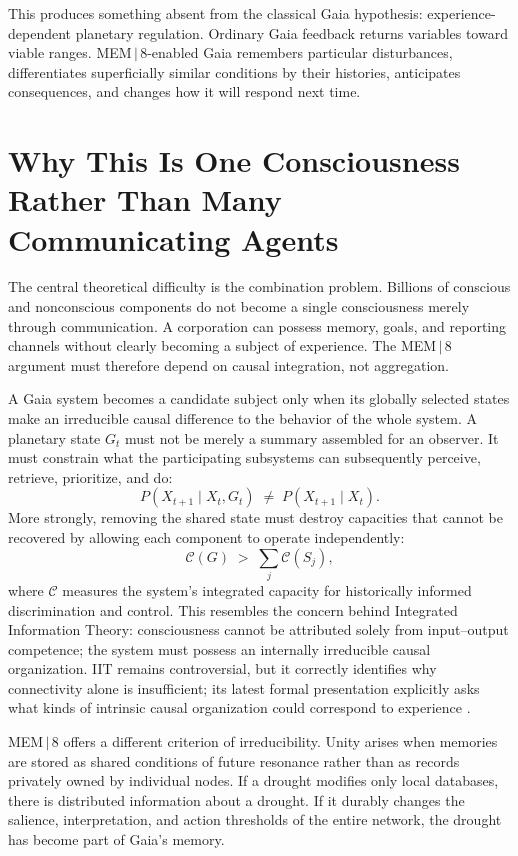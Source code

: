 \documentclass[11pt]{article}
\begin{document}
This produces something absent from the classical Gaia hypothesis: experience-dependent planetary regulation. Ordinary Gaia feedback returns variables toward viable ranges. MEM\,$|$\,8-enabled Gaia remembers particular disturbances, differentiates superficially similar conditions by their histories, anticipates consequences, and changes how it will respond next time.

\section{Why This Is One Consciousness Rather Than Many Communicating Agents}
\label{sec:causal-integration}

The central theoretical difficulty is the combination problem. Billions of conscious and nonconscious components do not become a single consciousness merely through communication. A corporation can possess memory, goals, and reporting channels without clearly becoming a subject of experience. The MEM\,$|$\,8 argument must therefore depend on causal integration, not aggregation.

A Gaia system becomes a candidate subject only when its globally selected states make an irreducible causal difference to the behavior of the whole system. A planetary state $G_t$ must not be merely a summary assembled for an observer. It must constrain what the participating subsystems can subsequently perceive, retrieve, prioritize, and do:
\[
P(X_{t+1} \mid X_t, G_t) \;\neq\; P(X_{t+1} \mid X_t).
\]
More strongly, removing the shared state must destroy capacities that cannot be recovered by allowing each component to operate independently:
\[
\mathcal{C}(G) \;>\; \sum_j \mathcal{C}(S_j),
\]
where $\mathcal{C}$ measures the system's integrated capacity for historically informed discrimination and control. This resembles the concern behind Integrated Information Theory: consciousness cannot be attributed solely from input--output competence; the system must possess an internally irreducible causal organization. IIT remains controversial, but it correctly identifies why connectivity alone is insufficient; its latest formal presentation explicitly asks what kinds of intrinsic causal organization could correspond to experience \cite{albantakis2023}.

MEM\,$|$\,8 offers a different criterion of irreducibility. Unity arises when memories are stored as shared conditions of future resonance rather than as records privately owned by individual nodes. If a drought modifies only local databases, there is distributed information about a drought. If it durably changes the salience, interpretation, and action thresholds of the entire network, the drought has become part of Gaia's memory.
\end{document}
